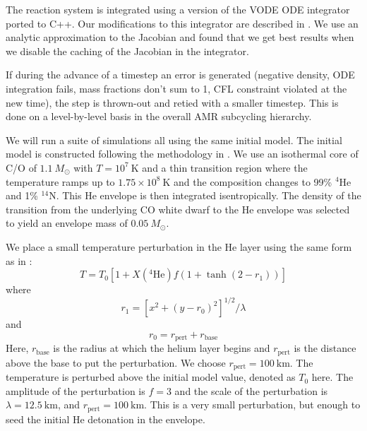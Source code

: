 \documentclass[modern]{aastex631}
\newcommand{\isot}[2]{$^{#2}\mathrm{#1}$}
\newcommand{\isotm}[2]{{}^{#2}\mathrm{#1}}
\begin{document}
The reaction system is integrated using a version of the VODE ODE integrator
\citep{vode} ported to C++.  Our modifications to this integrator are described
in \citet{castro_simple_sdc}.  We use an analytic approximation to the Jacobian
and found that we get best results when we disable the caching of the Jacobian
in the integrator.

If during the advance of a timestep an error is generated (negative
density, ODE integration fails, mass fractions don't sum to 1, CFL constraint violated at the new time), the
step is thrown-out and retied with a smaller timestep.  This is done
on a level-by-level basis in the overall AMR subcycling hierarchy.

We will run a suite of simulations all using the same initial model.
The initial model is constructed following the methodology in
\citet{subchandra}.  We use an isothermal core of C/O of $1.1~M_\odot$
with $T = 10^7~\mathrm{K}$ and a thin transition region where the
temperature ramps up to $1.75\times 10^8~\mathrm{K}$ and the
composition changes to 99\% \isot{He}{4} and 1\% \isot{N}{14}.    This He envelope is then integrated isentropically.  The
density of the transition from the underlying CO white dwarf to the He
envelope was selected to yield an envelope mass of $0.05~M_\odot$.

We place a small temperature perturbation in the He layer using the
same form as in \citet{castro_simple_sdc}:
\begin{equation}
  T = T_0 \left [ 1 + X(\isotm{He}{4}) f (1 + \tanh(2 - r_1)) \right ]
\end{equation}
where
\begin{equation}
  r_1 = \left [ x^2 + (y - r_0)^2 \right ]^{1/2} / \lambda
\end{equation}
and
\begin{equation}
  r_0 = r_\mathrm{pert} + r_\mathrm{base}
\end{equation}
Here, $r_\mathrm{base}$ is the radius at which the helium layer begins
and $r_\mathrm{pert}$ is the distance above the base to put the
perturbation.  We choose $r_\mathrm{pert} = 100~\mathrm{km}$.  The
temperature is perturbed above the initial model value, denoted as
$T_0$ here.  The amplitude of the perturbation is $f = 3$ and the
scale of the perturbation is $\lambda = 12.5~\mathrm{km}$, and
$r_\mathrm{pert} = 100~\mathrm{km}$.  This is a very small
perturbation, but enough to seed the initial He detonation in the
envelope.
\end{document}
